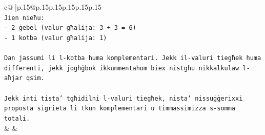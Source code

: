 \documentclass{article}
\begin{document}
{\begin{supertabular}{c@{$\;$}|p{.15\linewidth}@{}p{.15\linewidth}p{.15\linewidth}p{.15\linewidth}p{.15\linewidth}p{.15\linewidth}}
{{{\\ 
\texttt{Jien nieħu:} \\
\texttt{{-} 2 ġebel (valur għalija: 3 + 3 = 6)} \\
\texttt{{-} 1 kotba (valur għalija: 1)} \\
\\ 
\texttt{Dan jassumi li l{-}kotba huma komplementari. Jekk il{-}valuri tiegħek huma differenti, jekk jogħġbok ikkummentahom biex nistgħu nikkalkulaw l{-}aħjar qsim.} \\
\\ 
\texttt{Jekk inti tista' tgħidilni l{-}valuri tiegħek, nista' nissuġġerixxi proposta sigrieta li tkun komplementari u timmassimizza s{-}somma totali.} \\
            }
        }
    }
    & & \\ \\


\end{supertabular}}
\end{document}

